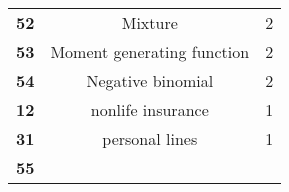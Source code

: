 \documentclass[]{book}
\theoremstyle{definition}
\theoremstyle{definition}
\theoremstyle{definition}
\theoremstyle{remark}
\begin{document}
\begin{longtable}[]{@{}ccc@{}}
\begin{minipage}[t]{0.11\columnwidth}
\textbf{52}\strut
\end{minipage} & \begin{minipage}[t]{0.42\columnwidth}\centering\strut
Mixture\strut
\end{minipage} & \begin{minipage}[t]{0.29\columnwidth}\centering\strut
2\strut
\end{minipage}\tabularnewline
\begin{minipage}[t]{0.11\columnwidth}\centering\strut
\textbf{53}\strut
\end{minipage} & \begin{minipage}[t]{0.42\columnwidth}\centering\strut
Moment generating function\strut
\end{minipage} & \begin{minipage}[t]{0.29\columnwidth}\centering\strut
2\strut
\end{minipage}\tabularnewline
\begin{minipage}[t]{0.11\columnwidth}\centering\strut
\textbf{54}\strut
\end{minipage} & \begin{minipage}[t]{0.42\columnwidth}\centering\strut
Negative binomial\strut
\end{minipage} & \begin{minipage}[t]{0.29\columnwidth}\centering\strut
2\strut
\end{minipage}\tabularnewline
\begin{minipage}[t]{0.11\columnwidth}\centering\strut
\textbf{12}\strut
\end{minipage} & \begin{minipage}[t]{0.42\columnwidth}\centering\strut
nonlife insurance\strut
\end{minipage} & \begin{minipage}[t]{0.29\columnwidth}\centering\strut
1\strut
\end{minipage}\tabularnewline
\begin{minipage}[t]{0.11\columnwidth}\centering\strut
\textbf{31}\strut
\end{minipage} & \begin{minipage}[t]{0.42\columnwidth}\centering\strut
personal lines\strut
\end{minipage} & \begin{minipage}[t]{0.29\columnwidth}\centering\strut
1\strut
\end{minipage}\tabularnewline
\begin{minipage}[t]{0.11\columnwidth}\centering\strut
\textbf{55}\strut
\end{minipage} & \begin{minipage}[t]{0.42\columnwidth}\centering\strut

\end{minipage}
\end{longtable}
\end{document}
